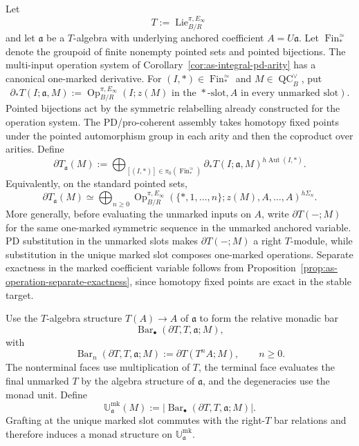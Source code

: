 \begin{construction}
\label{con:as-tangent-weight}
Let
\[
    T:=\operatorname{Lie}^{\pi,E_\infty}_{B/R}
\]
and let $\mathfrak a$ be a $T$-algebra with underlying anchored coefficient
$A=U\mathfrak a$.  Let $\operatorname{Fin}_*^{\simeq}$ denote the groupoid of
finite nonempty pointed sets and pointed bijections.  The multi-input
operation system of Corollary~\ref{cor:as-integral-pd-arity} has a canonical
one-marked derivative.  For $(I,*)\in\operatorname{Fin}_*^{\simeq}$ and
$M\in\operatorname{QC}^{\vee}_B$, put
\[
\boxed{
    \partial_*T(I;\mathfrak a,M)
    :=
    \operatorname{Op}^{\pi,E_\infty}_{B/R}
    \left(
        I;
        z(M)\text{ in the }*\text{-slot},
        A\text{ in every unmarked slot}
    \right).
}
\]
Pointed bijections act by the symmetric relabelling already constructed for
the operation system.  The PD/pro-coherent assembly takes homotopy fixed
points under the pointed automorphism group in each arity and then the
coproduct over arities.  Define
\[
\boxed{
    \partial T_{\mathfrak a}(M)
    :=
    \bigoplus_{[(I,*)]\in\pi_0(\operatorname{Fin}_*^{\simeq})}
    \partial_*T(I;\mathfrak a,M)^{h\operatorname{Aut}(I,*)}.
}
\]
Equivalently, on the standard pointed sets,
\[
\boxed{
    \partial T_{\mathfrak a}(M)
    \simeq
    \bigoplus_{n\geq0}
    \operatorname{Op}^{\pi,E_\infty}_{B/R}
    \left(
        \{*,1,\ldots,n\};
        z(M),A,\ldots,A
    \right)^{h\Sigma_n}.
}
\]
More generally, before evaluating the unmarked inputs on $A$, write
$\partial T(-;M)$ for the same one-marked symmetric sequence in the unmarked
anchored variable.  PD substitution in the unmarked slots makes
$\partial T(-;M)$ a right $T$-module, while substitution in the unique marked
slot composes one-marked operations.  Separate exactness in the marked
coefficient variable follows from
Proposition~\ref{prop:as-operation-separate-exactness}, since homotopy fixed
points are exact in the stable target.

Use the $T$-algebra structure $T(A)\to A$ of $\mathfrak a$ to form the
relative monadic bar
\[
    \operatorname{Bar}_\bullet
    (\partial T,T,\mathfrak a;M),
\]
with
\[
\boxed{
    \operatorname{Bar}_n
    (\partial T,T,\mathfrak a;M)
    :=
    \partial T(T^nA;M),
    \qquad n\geq0.
}
\]
The nonterminal faces use multiplication of $T$, the terminal face evaluates
the final unmarked $T$ by the algebra structure of $\mathfrak a$, and the
degeneracies use the monad unit.  Define
\[
\boxed{
    \mathbb U_{\mathfrak a}^{\mathrm{mk}}(M)
    :=
    \left|
        \operatorname{Bar}_\bullet
        (\partial T,T,\mathfrak a;M)
    \right|.
}
\]
Grafting at the unique marked slot commutes with the right-$T$ bar relations
and therefore induces a monad structure on
$\mathbb U_{\mathfrak a}^{\mathrm{mk}}$.
\end{construction}

